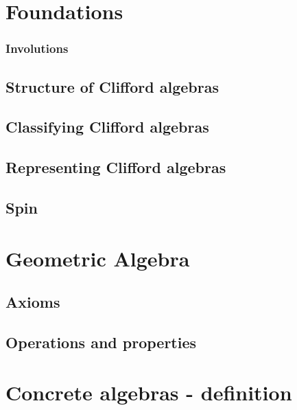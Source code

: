 \maketitle





\section{Foundations}
\label{cha:foundations}



\subsubsection{Involutions}

\subsection{Structure of Clifford algebras}

\subsection{Classifying Clifford algebras}

\subsection{Representing Clifford algebras}

\subsection{Spin}

\section{Geometric Algebra}

\subsection{Axioms}

\subsection{Operations and properties}

\section{Concrete algebras - definition}

